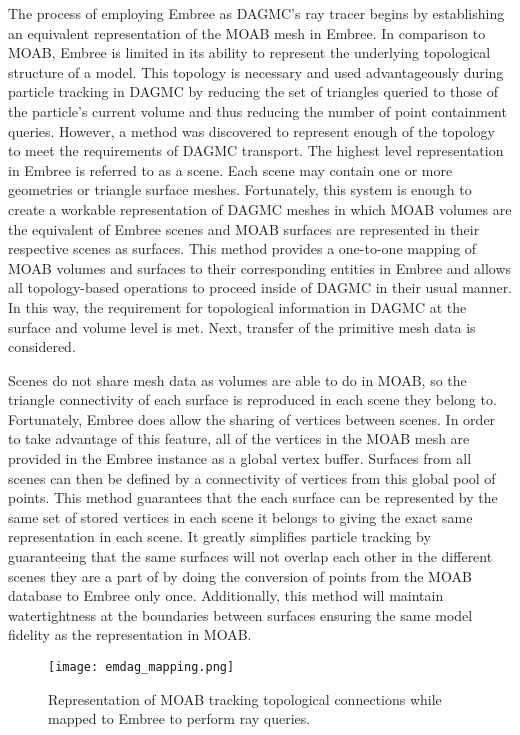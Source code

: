 The process of employing Embree as DAGMC's ray tracer begins by establishing an
equivalent representation of the MOAB mesh in Embree. In comparison to MOAB,
Embree is limited in its ability to represent the underlying topological
structure of a model. This topology is necessary and used advantageously during
particle tracking in DAGMC by reducing the set of triangles queried to those of
the particle's current volume and thus reducing the number of point containment
queries. However, a method was discovered to represent enough of the topology to
meet the requirements of DAGMC transport. The highest level representation in
Embree is referred to as a scene. Each scene may contain one or more geometries
or triangle surface meshes. Fortunately, this system is enough to create a
workable representation of DAGMC meshes in which MOAB volumes are the equivalent
of Embree scenes and MOAB surfaces are represented in their respective scenes as
surfaces. This method provides a one-to-one mapping of MOAB volumes and surfaces
to their corresponding entities in Embree and allows all topology-based
operations to proceed inside of DAGMC in their usual manner. In this way, the
requirement for topological information in DAGMC at the surface and volume level
is met. Next, transfer of the primitive mesh data is considered.

Scenes do not share mesh data as volumes are able to do in MOAB, so the triangle
connectivity of each surface is reproduced in each scene they belong
to. Fortunately, Embree does allow the sharing of vertices between scenes. In
order to take advantage of this feature, all of the vertices in the MOAB mesh
are provided in the Embree instance as a global vertex buffer. Surfaces from all
scenes can then be defined by a connectivity of vertices from this global pool
of points. This method guarantees that the each surface can be represented by
the same set of stored vertices in each scene it belongs to giving the exact
same representation in each scene. It greatly simplifies particle tracking by
guaranteeing that the same surfaces will not overlap each other in the different
scenes they are a part of by doing the conversion of points from the MOAB
database to Embree only once. Additionally, this method will maintain
watertightness at the boundaries between surfaces ensuring the same model
fidelity as the representation in MOAB.

\begin{figure}
  \centering
  \texttt{[image: emdag\_mapping.png]}
  \caption{Representation of MOAB tracking topological connections while mapped
    to Embree to perform ray queries.}
  \label{emdag_mapping}
\end{figure}

